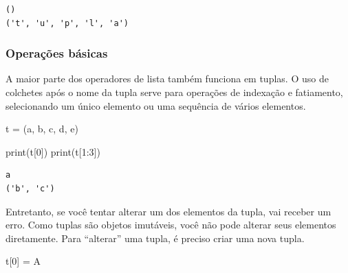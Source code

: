 \documentclass[
  brazilian,
  letterpaper,
  DIV=11,
  numbers=noendperiod]{scrreprt}
\newenvironment{Shaded}{\begin{snugshade}}{\end{snugshade}}
\newcommand{\BuiltInTok}[1]{\textcolor[rgb]{0.00,0.23,0.31}{#1}}
\newcommand{\DecValTok}[1]{\textcolor[rgb]{0.68,0.00,0.00}{#1}}
\newcommand{\NormalTok}[1]{\textcolor[rgb]{0.00,0.23,0.31}{#1}}
\newcommand{\OperatorTok}[1]{\textcolor[rgb]{0.37,0.37,0.37}{#1}}
\newcommand{\StringTok}[1]{\textcolor[rgb]{0.13,0.47,0.30}{#1}}
\begin{document}
\begin{verbatim}
()
('t', 'u', 'p', 'l', 'a')
\end{verbatim}

\subsubsection{Operações básicas}\label{operauxe7uxf5es-buxe1sicas-2}

A maior parte dos operadores de lista também funciona em tuplas. O uso
de colchetes após o nome da tupla serve para operações de indexação e
fatiamento, selecionando um único elemento ou uma sequência de vários
elementos.

\begin{Shaded}
\begin{Highlighting}[]
\NormalTok{t }\OperatorTok{=}\NormalTok{ (}\StringTok{\textquotesingle{}a\textquotesingle{}}\NormalTok{, }\StringTok{\textquotesingle{}b\textquotesingle{}}\NormalTok{, }\StringTok{\textquotesingle{}c\textquotesingle{}}\NormalTok{, }\StringTok{\textquotesingle{}d\textquotesingle{}}\NormalTok{, }\StringTok{\textquotesingle{}e\textquotesingle{}}\NormalTok{)}

\BuiltInTok{print}\NormalTok{(t[}\DecValTok{0}\NormalTok{])}
\BuiltInTok{print}\NormalTok{(t[}\DecValTok{1}\NormalTok{:}\DecValTok{3}\NormalTok{])}
\end{Highlighting}
\end{Shaded}

\begin{verbatim}
a
('b', 'c')
\end{verbatim}

Entretanto, se você tentar alterar um dos elementos da tupla, vai
receber um erro. Como tuplas são objetos imutáveis, você não pode
alterar seus elementos diretamente. Para ``alterar'' uma tupla, é
preciso criar uma nova tupla.

\begin{Shaded}
\begin{Highlighting}[]
\NormalTok{t[}\DecValTok{0}\NormalTok{] }\OperatorTok{=} \StringTok{\textquotesingle{}A\textquotesingle{}}
\end{Highlighting}
\end{Shaded}
\end{document}
